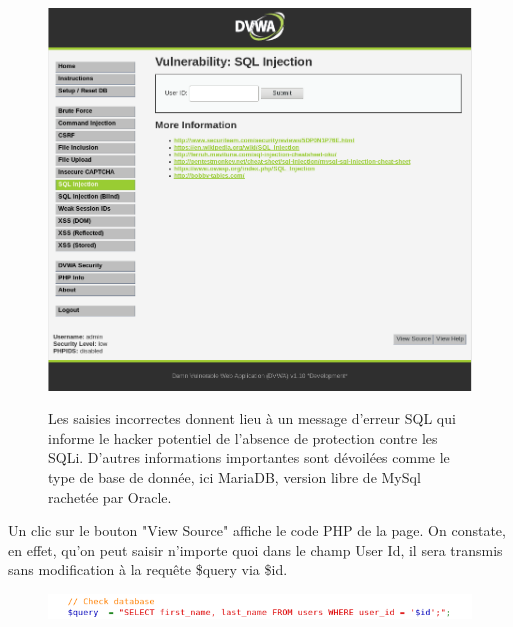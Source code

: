 \begin{figure}[!h]
	\begin{center}
		\label{}
		\includegraphics[scale=\scaledvwa]{images/sql/sqli1.png}
		\caption{Les saisies incorrectes donnent lieu à un message d'erreur SQL qui informe le hacker potentiel de l'absence de protection contre les SQLi. D'autres informations importantes sont dévoilées comme le type de base de donnée, ici MariaDB, version libre de MySql rachetée par Oracle.}
	\end{center}
\end{figure}

Un clic sur le bouton "View Source" affiche le code PHP de la page. On constate, en effet, qu'on peut saisir n'importe quoi dans le champ User Id, il sera transmis sans modification à la requête \$query via \$id.   

\begin{figure}[!h]
	\begin{center}
		\label{}
		\includegraphics[scale=0.8]{images/sql/code_low.png}
	\end{center}
\end{figure}


